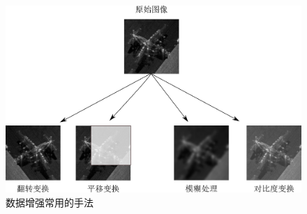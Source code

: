 \documentclass[a4paper,11pt]{article}
\begin{document}
\begin{figure}[htb]
\centering
\includegraphics[scale=0.5]{./figure/tuxiang.png}
\caption{数据增强常用的手法}
\label{fig:imgaug}
\end{figure}
\end{document}
